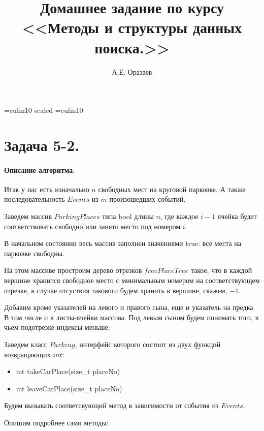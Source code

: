 \documentclass[12pt]{article}
\title{\bf Домашнее задание по курсу \\ <<Методы
и структуры данных поиска.>>}
\author{А.Е. Оразаев}
\date{}
\begin{document}
\voffset=-20mm
\hoffset=-12mm
\font\Got=eufm10 scaled \font\Got=eufm10

\maketitle

\section{Задача 5-2.}
\paragraph{Описание алгоритма.}
Итак у нас есть изначально $ n $ свободных мест на круговой парковке.
А также последовательность $ Events $ из $ m $ произошедших событий.

Заведем массив $ ParkingPlaces $ типа bool длины $ n $, где каждое $ i - 1 $ ячейка
будет соответствовать свободно или занято место под номером $ i $.

В начальном состоянии весь массив заполнен значениями true: все места
на парковке свободны.

На этом массиве простроим дерево отрезков $ freePlaceTree $ такое, что в
каждой вершине хранится свободное место с минимальным номером на
соответствующем отрезке, в случае отсуствия такового будем хранить в
вершине, скажем, $ -1 $.

Добавим кроме указателей на левого и правого сына, еще и указатель на
предка. В том числе и в листы-ячейки массива. Под левым сыном будем
понимать того, в чьем подотрезке индексы меньше.

Заведем класс $ Parking $, интерфейс которого состоит из двух функций
возвращающих $ int $:
\begin{itemize}
    \item int takeCarPlace(size\_t placeNo)
    \item int leaveCarPlace(size\_t placeNo)
\end{itemize}
Будем вызывать соответсвующий метод в зависимости от события из $ Events $.

Опишим подробнее сами методы:
\end{document}
